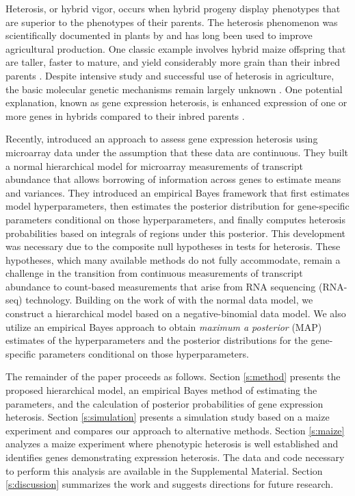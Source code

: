 \documentclass[useAMS,usenatbib,referee]{biom}
\begin{document}
Heterosis, or hybrid vigor, occurs when hybrid progeny display phenotypes that are superior to the phenotypes of their parents.  The heterosis phenomenon was scientifically documented in plants by \cite{darwin1876effects}and has long been used to improve agricultural production.  One classic example involves hybrid maize offspring that are taller, faster to mature, and yield considerably more grain than their inbred parents \citep{hallauer1981quantitative, hallauer2010quantitative}.  Despite intensive study and successful use of heterosis in agriculture, the basic molecular genetic mechanisms remain largely unknown \citep{coors1999genetics, lippman2007heterosis}. One potential explanation, known as gene expression heterosis, is enhanced expression of one or more genes in hybrids compared to their inbred parents \citep{swanson2006all, springer2007allelic}.

Recently, \cite{ji2014estimation} introduced an approach to assess gene expression heterosis using microarray data under the assumption that these data are continuous. They built a normal hierarchical model for microarray measurements of transcript abundance that allows borrowing of information across genes to estimate means and variances. They introduced an empirical Bayes framework that first estimates model hyperparameters, then estimates the posterior distribution for gene-specific parameters conditional on those hyperparameters, and finally computes heterosis probabilities based on integrals of regions under this posterior. This development was necessary due to the composite null hypotheses in tests for heterosis. These hypotheses, which many available methods do not fully accommodate, remain a challenge in the transition from continuous measurements of transcript abundance to count-based measurements that arise from RNA sequencing (RNA-seq) technology. Building on the work of \citeauthor{ji2014estimation} with the normal data model, we construct a hierarchical model based on a negative-binomial data model. We also utilize an empirical Bayes approach to obtain \emph{maximum a posterior} (MAP) estimates of the hyperparameters and the posterior distributions for the gene-specific parameters conditional on those hyperparameters. 

The remainder of the paper proceeds as follows. Section \ref{s:method} presents the proposed hierarchical model, an empirical Bayes method of estimating the parameters, and the calculation of posterior probabilities of gene expression heterosis. Section \ref{s:simulation} presents a simulation study based on a maize experiment and compares our approach to alternative methods. Section \ref{s:maize} analyzes a maize experiment where phenotypic heterosis is well established and identifies genes demonstrating expression heterosis. The data and code necessary to perform this analysis are available in the Supplemental Material. Section \ref{s:discussion} summarizes the work and suggests directions for future research.
\end{document}
